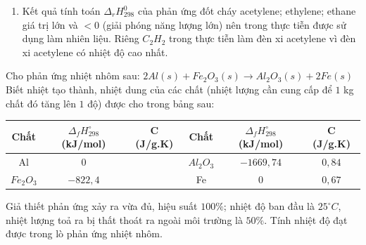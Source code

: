 \documentclass[Main.tex]{subfiles}
\begin{document}
\begin{bt}
{\begin{enumerate}
\begin{eqnarray}
				&=& 2 \times (-393{,}5) + 2 \times (-241{,}82) - (52{,}47) = -1\,323{,}11 \text{ kJ} \nonumber\\
				\Delta_rH_{298}^0 (5) &=& 4 \times \Delta_fH_{298}^0 (CO_2) + 6 \times \Delta_fH_{298}^0 (H_2O) - 7 \times \Delta_fH_{298}^0 (O_2) - 2 \times \Delta_fH_{298}^0 (C_2H_6) \nonumber\\
				&=& 4 \times (-393{,}5) + 6 \times (-241{,}82) - 2 \times (-84{,}67) = -2\,855{,}58 \text{ kJ} \nonumber
			\end{eqnarray}
			\item Kết quả tính toán $\Delta_rH_{298}^0$ của phản ứng đốt cháy acetylene; ethylene; ethane giá trị lớn và $< 0$ (giải phóng năng lượng lớn) nên trong thực tiễn được sử dụng làm nhiên liệu.
			Riêng $C_2H_2$ trong thực tiễn làm đèn xi acetylene vì đèn xi acetylene có nhiệt độ cao nhất.
		\end{enumerate}
		}
	\end{bt}
	\begin{bt}
		Cho phản ứng nhiệt nhôm sau: $2Al(s) + Fe_2O_3(s) \longrightarrow Al_2O_3(s) + 2Fe(s)$
		Biết nhiệt tạo thành, nhiệt dung của các chất (nhiệt lượng cần cung cấp để $1$ kg chất đó tăng lên $1$ độ) được cho trong bảng sau:
		\begin{center}
			\begin{tabular}{|c|c|c|c|c|c|}
			\hline
			Chất & $\Delta_f H_{298}^\circ$ (kJ/mol) & C (J/g.K) & Chất & $\Delta_f H_{298}^\circ$ (kJ/mol) & C (J/g.K) \\
			\hline
			Al & $0$ &  & $Al_2O_3$ & $-1669{,}74$ & $0{,}84$ \\
			\hline
			$Fe_2O_3$ & $-822{,}4$ &  & Fe & $0$ & $0{,}67$ \\
			\hline
			\end{tabular}
		\end{center}
		Giả thiết phản ứng xảy ra vừa đủ, hiệu suất $100 \%$; nhiệt độ ban đầu là $25^\circ C$, nhiệt lượng toả ra bị thất thoát ra ngoài môi trường là $50 \%$. Tính nhiệt độ đạt được trong lò phản ứng nhiệt nhôm.
	\end{bt}
\end{document}
